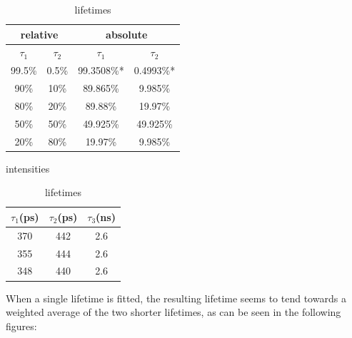 \begin{table}[h]
    \centering
    \begin{subtable}[t]{0.48\textwidth}
        \flushleft
        \begin{tabular}{|c|c|c|c|}
            \hline
            \multicolumn{2}{|c|}{relative} & \multicolumn{2}{|c|}{absolute} \\
            \hline
            $\tau_1$ & $\tau_2$ & $\tau_1$    & $\tau_2$   \\
            \hline
            99.5\% & 0.5\% & 99.3508\%*  &  0.4993\%* \\
            90\%   & 10\% & 89.865\%    &  9.985\%   \\
            80\%   & 20\% & 89.88\%     & 19.97\%    \\
            50\%   & 50\% & 49.925\%    & 49.925\%   \\
            20\%   & 80\% & 19.97\%     &  9.985\%   \\
            \hline
        \end{tabular}
        \caption{intensities}
    \end{subtable}

    \hspace{\fill}

    \begin{subtable}[t]{0.48\textwidth}
        \begin{tabular}{|c|c|c|}
            \hline
            $\tau_1$(ps) & $\tau_2$(ps) & $\tau_3$(ns)\\
            \hline
            370 & 442 & 2.6 \\
            355 & 444 & 2.6 \\
            348 & 440 & 2.6 \\
            \hline
        \end{tabular}
        \caption{lifetimes}
    \end{subtable}
\end{table}

When a single lifetime is fitted, the resulting lifetime seems to tend towards a weighted average of the two shorter lifetimes, as can be seen in the following figures:

